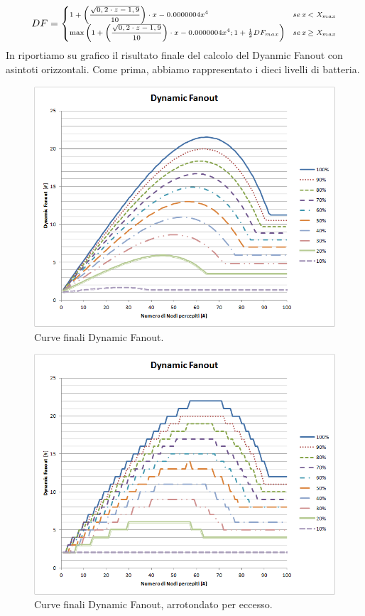 \begin{equation}
\label{eq:DF_totale}
\scriptsize
DF = \begin{cases} 1 + \left( \dfrac{\sqrt{0,2\cdot z - 1,9}}{10} \right) \cdot x- 0.0000004x^4 & se\,\textit{x}<\textit{X}_{max}\\
					\max \left( 1 + \left( \dfrac{\sqrt{0,2\cdot z - 1,9}}{10} \right) \cdot x- 0.0000004x^4 ; 1 + \frac{1}{2}DF_{max} \right) & se\,\textit{x}\geq\textit{X}_{max}\end{cases}
\normalsize
\end{equation}
In  riportiamo su grafico il risultato finale del calcolo del Dyanmic Fanout con asintoti orizzontali. Come prima, abbiamo rappresentato i dieci livelli di batteria.
\bigskip
\begin{figure}[bh]
	\centering
	\includegraphics[width=0.9\linewidth]{Images/grafici_usati/DF_tot_no_arr}
	\caption[DF totale continuo]{Curve finali Dynamic Fanout.}
	\label{fig:DF_tot_no_arr}
\end{figure}
\begin{figure}[tbh]
	\centering
	\includegraphics[width=0.9\linewidth]{Images/grafici_usati/DF_tot_arr}
	\caption[DF totale arrotondato]{Curve finali Dynamic Fanout, arrotondato per eccesso.}
	\label{fig:DF_tot_arr}
\end{figure}
